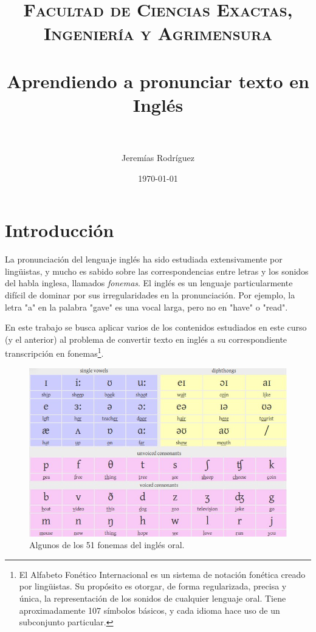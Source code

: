 \documentclass[paper=a4, fontsize=11pt]{scrartcl} %
\title{   
\normalfont \normalsize 
\textsc{Facultad de Ciencias Exactas, Ingeniería y Agrimensura} \\ [25pt] %
\horrule{0.5pt} \\[0.4cm] %
\huge Aprendiendo a pronunciar texto en Inglés \\ %
\horrule{2pt} \\[0.5cm] %
}
\author{Jeremías Rodríguez} %
\date{\normalsize\today} %
\numberwithin{equation}{section} %
\numberwithin{figure}{section} %
\numberwithin{table}{section} %
\begin{document}
\maketitle %


\section{Introducción}

\par La pronunciación del lenguaje inglés ha sido estudiada extensivamente por lingüistas, y mucho es sabido sobre las correspondencias entre letras y los sonidos del habla inglesa, llamados \emph{fonemas}.  El inglés es un lenguaje particularmente difícil de dominar por sus irregularidades en la pronunciación. Por ejemplo, la letra "a" en la palabra "gave" es una vocal larga,  pero no en "have" o "read".\\
\par En este trabajo se busca aplicar varios de los contenidos estudiados en este curso (y el anterior) al problema de convertir texto en inglés a su correspondiente transcripción en fonemas\footnote{El Alfabeto Fonético Internacional es un sistema de notación fonética creado por lingüistas. Su propósito es otorgar, de forma regularizada, precisa y única, la representación de los sonidos de cualquier lenguaje oral. Tiene aproximadamente 107 símbolos básicos, y cada idioma hace uso de un subconjunto particular.}. \\

\begin{figure}[h!]
\centering
\includegraphics[width=120mm]{phonemicChart.jpg}
\caption{Algunos de los 51 fonemas del inglés oral.}
\label{fig:method}
\end{figure}
\end{document}
